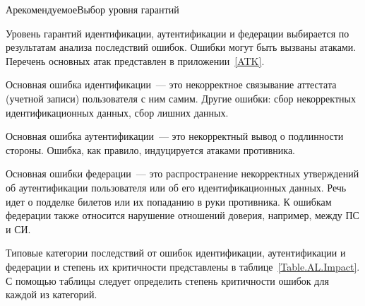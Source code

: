 \begin{appendix}{А}{рекомендуемое}{Выбор уровня гарантий}\label{AL}

\label{AL.Errors}

Уровень гарантий идентификации, аутентификации и федерации выбирается 
по результатам анализа последствий ошибок. Ошибки могут быть вызваны атаками.
Перечень основных атак представлен в приложении~\ref{ATK}.

Основная ошибка идентификации~--- это некорректное связывание аттестата (учетной записи)
пользователя с ним самим. Другие ошибки: сбор некорректных 
идентификационных данных, сбор лишних данных.

Основная ошибка аутентификации~--- это некорректный вывод о подлинности 
стороны. Ошибка, как правило, индуцируется атаками противника.

Основная ошибки федерации~--- это распространение некорректных утверждений
об аутентификации пользователя или об его идентификационных данных. Речь идет о 
подделке билетов или их попаданию в руки противника. К ошибкам федерации также 
относится нарушение отношений доверия, например, между ПС и СИ. 

\label{AL.Impact}

Типовые категории последствий от ошибок идентификации, аутентификации и 
федерации и степень их критичности представлены в 
таблице~\ref{Table.AL.Impact}. 
%
С помощью таблицы следует определить степень критичности ошибок для каждой из
категорий.


\end{appendix}

